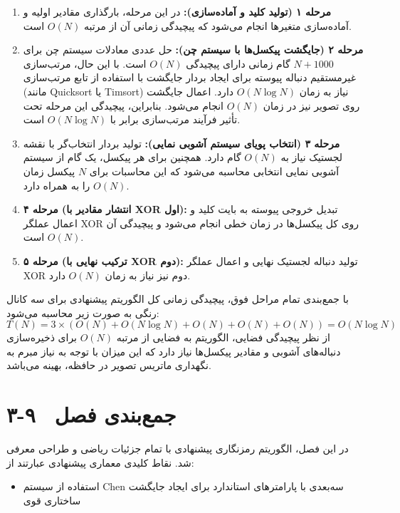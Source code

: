 \begin{enumerate}
    \item \textbf{مرحله ۱ (تولید کلید و آماده‌سازی):} در این مرحله، بارگذاری مقادیر اولیه و آماده‌سازی متغیرها انجام می‌شود که پیچیدگی زمانی آن از مرتبه $O(N)$ است.
    \item \textbf{مرحله ۲ (جایگشت پیکسل‌ها با سیستم چن):} حل عددی معادلات سیستم چن برای $N + 1000$ گام زمانی دارای پیچیدگی $O(N)$ است. با این حال، مرتب‌سازی غیرمستقیم دنباله پیوسته برای ایجاد بردار جایگشت با استفاده از تابع مرتب‌سازی (مانند ‎Quicksort‎ یا ‎Timsort‎) نیاز به زمان $O(N \log N)$ دارد. اعمال جایگشت روی تصویر نیز در زمان $O(N)$ انجام می‌شود. بنابراین، پیچیدگی این مرحله تحت تأثیر فرآیند مرتب‌سازی برابر با $O(N \log N)$ است.
    \item \textbf{مرحله ۳ (انتخاب پویای سیستم آشوبی نمایی):} تولید بردار انتخاب‌گر با نقشه لجستیک نیاز به $O(N)$ گام دارد. همچنین برای هر پیکسل، یک گام از سیستم آشوبی نمایی انتخابی محاسبه می‌شود که این محاسبات برای $N$ پیکسل زمان $O(N)$ را به همراه دارد.
    \item \textbf{مرحله ۴ (انتشار مقادیر با ‎XOR‎ اول):} تبدیل خروجی پیوسته به بایت کلید و اعمال عملگر ‎XOR‎ روی کل پیکسل‌ها در زمان خطی انجام می‌شود و پیچیدگی آن $O(N)$ است.
    \item \textbf{مرحله ۵ (ترکیب نهایی با ‎XOR‎ دوم):} تولید دنباله لجستیک نهایی و اعمال عملگر ‎XOR‎ دوم نیز نیاز به زمان $O(N)$ دارد.
\end{enumerate}

با جمع‌بندی تمام مراحل فوق، پیچیدگی زمانی کل الگوریتم پیشنهادی برای سه کانال رنگی به صورت زیر محاسبه می‌شود:
\begin{equation}
T(N) = 3 \times \left( O(N) + O(N \log N) + O(N) + O(N) + O(N) \right) = O(N \log N)
\label{eq:complexity_time}
\end{equation}
از نظر پیچیدگی فضایی، الگوریتم به فضایی از مرتبه $O(N)$ برای ذخیره‌سازی دنباله‌های آشوبی و مقادیر پیکسل‌ها نیاز دارد که این میزان با توجه به نیاز مبرم به نگهداری ماتریس تصویر در حافظه، بهینه می‌باشد.

\section{۳-۹  جمع‌بندی فصل}

در این فصل، الگوریتم رمزنگاری پیشنهادی با تمام جزئیات ریاضی و طراحی معرفی شد. نقاط کلیدی معماری پیشنهادی عبارتند از:

\begin{itemize}
    \item استفاده از سیستم ‎Chen‎ سه‌بعدی با پارامترهای استاندارد برای ایجاد جایگشت ساختاری قوی
\end{itemize}

